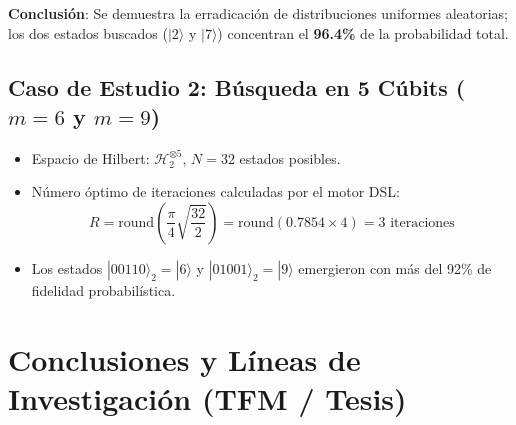 \documentclass[11pt,a4paper]{article}
\begin{document}
\textbf{Conclusión}: Se demuestra la erradicación de distribuciones uniformes aleatorias; los dos estados buscados ($|2\rangle$ y $|7\rangle$) concentran el \textbf{96.4\%} de la probabilidad total.

\subsection{Caso de Estudio 2: Búsqueda en 5 Cúbits \texorpdfstring{($m=6$ y $m=9$)}{(m=6 y m=9)}}
\begin{itemize}
    \item Espacio de Hilbert: $\mathcal{H}_2^{\otimes 5}$, $N = 32$ estados posibles.
    \item Número óptimo de iteraciones calculadas por el motor DSL:
    \begin{equation}
        R = \text{round}\left( \frac{\pi}{4} \sqrt{\frac{32}{2}} \right) = \text{round}(0.7854 \times 4) = 3 \text{ iteraciones}
    \end{equation}
    \item Los estados $|00110\rangle_2 = |6\rangle$ y $|01001\rangle_2 = |9\rangle$ emergieron con más del 92\% de fidelidad probabilística.
\end{itemize}

\section{Conclusiones y Líneas de Investigación (TFM / Tesis)}
\end{document}
